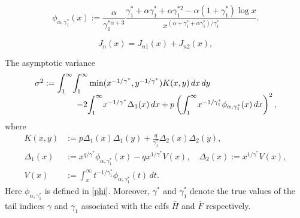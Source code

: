\documentclass[10pt,a4paper]{amsart}
\begin{document}
\begin{equation}
\phi_{\alpha,\gamma_{1}^{\ast}}\left(  x\right)  :=\frac{\alpha}{\gamma
_{1}^{\ast\alpha+3}}\frac{\gamma_{1}^{\ast}+\alpha\gamma_{1}^{\ast}%
+\alpha\gamma_{1}^{\ast2}-\alpha\left(  1+\gamma_{1}^{\ast}\right)  \log
x}{x^{\left(  \alpha+\gamma_{1}^{\ast}+\alpha\gamma_{1}^{\ast}\right)
/\gamma_{1}^{\ast}}}.\label{phi}%
\end{equation}

\begin{equation}
J_{n}\left(  x\right)  =J_{n1}\left(  x\right)  +J_{n2}\left(  x\right)
,\label{Jn}%
\end{equation}

\begin{proposition}
\label{prop2} The asymptotic variance%
\begin{equation}%
\begin{array}
[c]{l}%
\sigma^{2}:=%
{\displaystyle\int\nolimits_{1}^{\infty}}
{\displaystyle\int\nolimits_{1}^{\infty}}
\min(x^{-1/\gamma^{\ast}},y^{-1/\gamma^{\ast}})K(x,y)\,dx\,dy\\
\ \ \ \ \ \ \ \ \ \ \ \ \ \ \ -2%
{\displaystyle\int\nolimits_{1}^{\infty}}
x^{-1/\gamma^{\ast}}\Delta_{1}(x)\,dx+p\left(
{\displaystyle\int\nolimits_{1}^{\infty}}
x^{-1/\gamma_{1}^{\ast}}\phi_{\alpha,\gamma_{1}^{\ast}}(x)\,dx\right)  ^{2},
\end{array}
\label{sigma}%
\end{equation}
where
\begin{align*}
K(x,y)  &  :=p\Delta_{1}(x)\Delta_{1}(y)+\frac{q}{\gamma_{1}^{\ast}}\Delta
_{2}(x)\Delta_{2}(y),\\
\Delta_{1}(x)  &  :=x^{q/\gamma^{\ast}}\phi_{\alpha,\gamma_{1}^{\ast}%
}(x)-qx^{1/\gamma^{\ast}}V(x),\quad\Delta_{2}(x):=x^{1/\gamma^{\ast}}V(x),\\
V(x)  &  :=\int_{x}^{\infty}t^{-1/\gamma_{1}^{\ast}}\phi_{\alpha,\gamma
_{1}^{\ast}}(t)\,dt.
\end{align*}
Here $\phi_{\alpha,\gamma_{1}^{\ast}}$ is defined in \ref{phi}. Moreover,
$\gamma^{\ast}$ and $\gamma_{1}^{\ast}$ denote the true values of the tail
indices $\gamma$ and $\gamma_{1}$ associated with the cdfs $\overline{H}$ and
$\overline{F}$ respectively.
\end{proposition}
\end{document}
